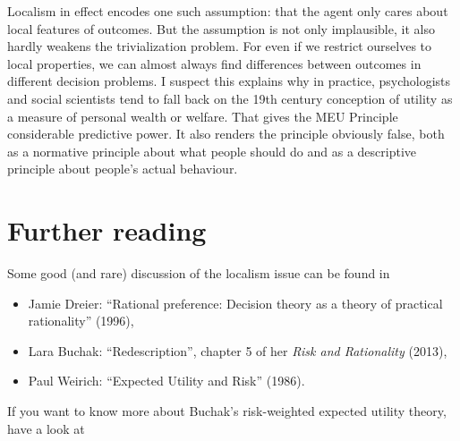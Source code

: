 Localism in effect encodes one such assumption: that the agent only
cares about local features of outcomes. But the assumption is not only
implausible, it also hardly weakens the trivialization problem. For
even if we restrict ourselves to local properties, we can almost
always find differences between outcomes in different decision
problems. I suspect this explains why in practice, psychologists and
social scientists tend to fall back on the 19th century conception of
utility as a measure of personal wealth or welfare. That gives the MEU
Principle considerable predictive power. It also renders the principle
obviously false, both as a normative principle about what people
should do and as a descriptive principle about people's actual behaviour.




\section{Further reading}

Some good (and rare) discussion of the localism issue can be found in

\begin{itemize}
\item Jamie Dreier: ``Rational preference: Decision theory as a theory of practical rationality'' (1996), 
\item Lara Buchak: ``Redescription'', chapter 5 of her \emph{Risk and Rationality} (2013),
\item Paul Weirich: ``Expected Utility and Risk'' (1986).
\end{itemize}
%
If you want to know more about Buchak's risk-weighted expected utility
theory, have a look at

